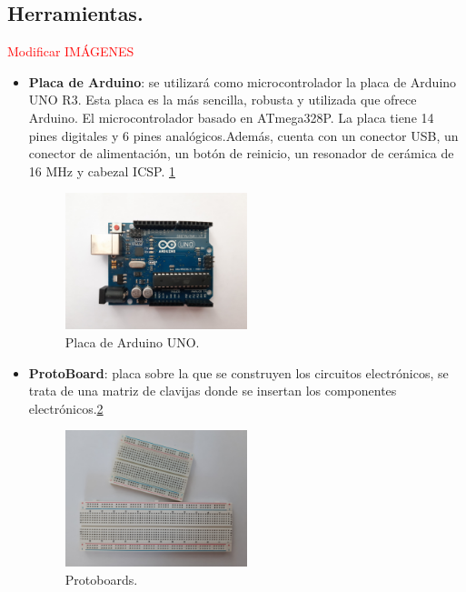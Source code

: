 \subsection{Herramientas.}
\textcolor{red}{Modificar IMÁGENES}
\begin{itemize}
\item \textbf{Placa de Arduino}\cite{Arduino1,Arduino2}: se utilizará como microcontrolador la placa de Arduino UNO R3. Esta placa es la más sencilla, robusta y utilizada que ofrece Arduino. El microcontrolador basado en ATmega328P. La placa tiene 14 pines digitales y 6 pines analógicos.Además, cuenta con un conector USB, un conector de alimentación, un botón de reinicio, un resonador de cerámica de 16 MHz y cabezal ICSP. \ref{fig:arduino}
\begin{figure}[h!]
    \centering
    \includegraphics[width=0.5\textwidth]{img/imgArduinoUNO.jpg}
    \caption{Placa de Arduino UNO.}
    \label{fig:arduino} %
\end{figure}

\item \textbf{ProtoBoard}: placa sobre la que se construyen los circuitos electrónicos, se trata de una matriz de clavijas donde se insertan los componentes electrónicos.\ref{fig:protoboard}
\begin{figure}[h!]
    \centering
    \includegraphics[width=0.5\textwidth]{img/imgProtoboards.jpg}
    \caption{Protoboards.}
    \label{fig:protoboard} %
\end{figure}


\end{itemize}
